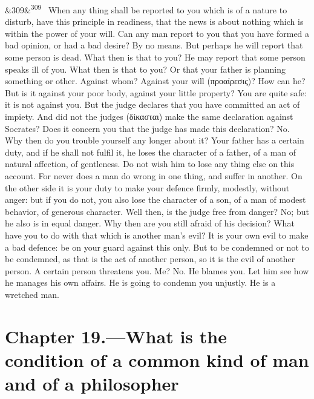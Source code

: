 \documentclass[12pt]{article}
\newcommand{\para}[1][]{\par\noindent\ifx&#1&\else\textsuperscript{\footnotesize #1}~\fi}
\begin{document}
\para[309] When any thing shall be reported to you which is of a nature to disturb, have this principle in readiness, that the news is about nothing which is within the power of your will. Can any man report to you that you have formed a bad opinion, or had a bad desire? By no means. But perhaps he will report that some person is dead. What then is that to you? He may report that some person speaks ill of you. What then is that to you? Or that your father is planning something or other. Against whom? Against your will (προαίρεσις)? How can he? But is it against your poor body, against your little property? You are quite safe: it is not against you. But the judge declares that you have committed an act of impiety. And did not the judges (δίκασται) make the same declaration against Socrates? Does it concern you that the judge has made this declaration? No. Why then do you trouble yourself any longer about it? Your father has a certain duty, and if he shall not fulfil it, he loses the character of a father, of a man of natural affection, of gentleness. Do not wish him to lose any thing else on this account. For never does a man do wrong in one thing, and suffer in another. On the other side it is your duty to make your defence firmly, modestly, without anger: but if you do not, you also lose the character of a son, of a man of modest behavior, of generous character. Well then, is the judge free from danger? No; but he also is in equal danger. Why then are you still afraid of his decision? What have you to do with that which is another man's evil? It is your own evil to make a bad defence: be on your guard against this only. But to be condemned or not to be condemned, as that is the act of another person, so it is the evil of another person. A certain person threatens you. Me? No. He blames you. Let him see how he manages his own affairs. He is going to condemn you unjustly. He is a wretched man.

\section*{Chapter 19.---What is the condition of a common kind of man and of a philosopher}
\end{document}
